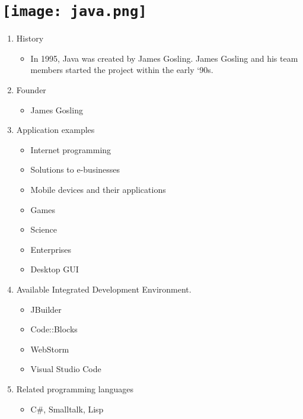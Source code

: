 \section{\texttt{[image: java.png]}}
\begin{frame}
	
	
	\begin{enumerate}
		\item History
		\begin{itemize}
			\item In 1995, Java was created by James Gosling. James Gosling and his team members started the project within the early ‘90s.
		\end{itemize}
		\item Founder
		\begin{itemize}
			\item James Gosling
		\end{itemize}
		\item Application examples
		\begin{itemize}
			\item Internet programming
			\item Solutions to e-businesses
			\item Mobile devices and their applications
			\item Games
			\item Science
			\item Enterprises
			\item Desktop GUI
		\end{itemize}
		\item Available Integrated Development Environment.
		\begin{itemize}
			\item JBuilder
			\item Code::Blocks
			\item WebStorm
			\item Visual Studio Code
			
		\end{itemize}
		\item Related programming languages
		\begin{itemize}
			\item C#, Smalltalk, Lisp
		\end{itemize}
	\end{enumerate}
	
\end{frame}

